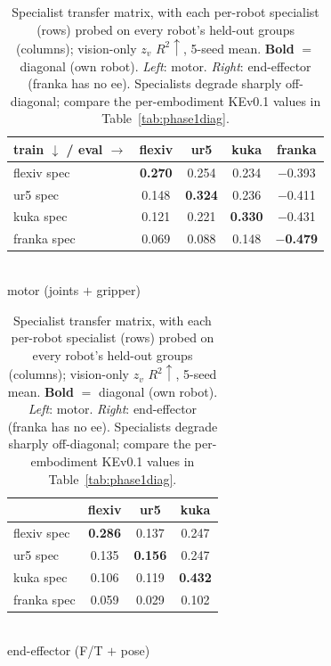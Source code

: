 \documentclass{article}
\begin{document}
\begin{table}[!htbp]
  \centering
  \caption{Specialist transfer matrix, with each per-robot specialist (rows) probed on
  every robot's held-out groups (columns); vision-only $z_v$ $R^2\uparrow$, 5-seed mean. \textbf{Bold} $=$ diagonal (own robot). \emph{Left}: motor. \emph{Right}: end-effector (franka has no ee). Specialists degrade sharply off-diagonal; compare the per-embodiment KEv0.1 values in Table~\ref{tab:phase1diag}.}
  \label{tab:phase1matrix}
  \begin{minipage}{0.60\textwidth}
    \centering
    \small
    \begin{tabular}{lcccc}
      \toprule
      train $\downarrow$ / eval $\rightarrow$ & flexiv & ur5 & kuka & franka \\
      \midrule
      flexiv spec & \textbf{0.270} & 0.254 & 0.234 & $-$0.393 \\
      ur5 spec    & 0.148 & \textbf{0.324} & 0.236 & $-$0.411 \\
      kuka spec   & 0.121 & 0.221 & \textbf{0.330} & $-$0.431 \\
      franka spec & 0.069 & 0.088 & 0.148 & \textbf{$-$0.479} \\
      \bottomrule
    \end{tabular}
    \\[2pt]{\footnotesize motor (joints $+$ gripper)}
  \end{minipage}%
  \begin{minipage}{0.40\textwidth}
    \centering
    \small
    \begin{tabular}{lccc}
      \toprule
      & flexiv & ur5 & kuka \\
      \midrule
      flexiv spec & \textbf{0.286} & 0.137 & 0.247 \\
      ur5 spec    & 0.135 & \textbf{0.156} & 0.247 \\
      kuka spec   & 0.106 & 0.119 & \textbf{0.432} \\
      franka spec & 0.059 & 0.029 & 0.102 \\
      \bottomrule
    \end{tabular}
    \\[2pt]{\footnotesize end-effector (F/T $+$ pose)}
  \end{minipage}
\end{table}
\end{document}
